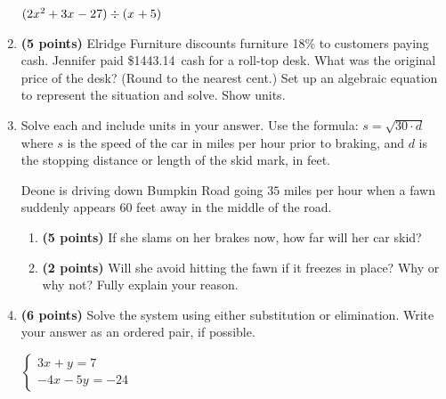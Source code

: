 \documentclass[12pt]{amsart}
\begin{document}
\begin{enumerate}
$(2x^{2}+3x^{}-27) \div (x^{}+5)$

\vfill  \vfill \vfill
\newpage\def \discount{18}\def \paid{1443.14}\def \rainy{9.13}\def \orcost{1759.93}\def \purcost{1223.00}\def \orrainy{11.13}
\item {\bf (5 points)} 
 Elridge Furniture discounts furniture \discount\% to customers paying cash. Jennifer paid \$\paid\ cash for a roll-top desk. What was the original price of the desk? (Round to the nearest cent.) Set up an algebraic equation to represent the situation and solve. Show units.

\vfill 
\def \insvar{30}\def \d{60}\def \zerospeed{42.43}\def \slimit{35}\def \s{54}\def \skidd{97.2}\def \safed{40.833}\def \rsafed{40}

 
\item Solve each and include units in your answer. Use the formula: $s = \sqrt{\insvar \cdot d}$ where $s$ is the speed of the car in miles per hour prior to braking, and $d$ is the stopping distance or length of the skid mark, in feet. 

\vspace{3mm}

Deone is driving down Bumpkin Road going $\slimit$ miles per hour when a fawn suddenly appears $\d$ feet away in the middle of the road. \begin{enumerate}
\item {\bf (5 points)} If she slams on her brakes now, how far will her car skid? \vspace{4cm}
\item {\bf (2 points)} Will she avoid hitting the fawn if it freezes in place? Why or why not? Fully explain your reason. \vspace{3cm}
\end{enumerate}


\newpage\def \xis{1}\def \yis{4}\def \nomatcho{[2,5,3,2]}\def \a{2}\def \c{-5}\def \b{-3}\def \d{2}\def \polyonesol{-10}\def \polytwosol{3}\def \xgoodone{2x^{}}\def \ygoodone{-3y^{}}\def \xgoodtwo{-5x^{}}\def \ygoodtwo{+2y^{}}\def \unitize{[0,1,0,0,1,0]}\def \mtem{3}\def \ntem{4}\def \ptem{-4}\def \qtem{-5}\def \m{3}\def \n{1}\def \p{-4}\def \q{-5}\def \polytonesol{7}\def \polyttwosol{-24}\def \xtgoodone{3x^{}}\def \ytgoodone{+y^{}}\def \xtgoodtwo{-4x^{}}\def \ytgoodtwo{-5y^{}}
\item {\bf (6 points)} 
 Solve the system using either substitution or elimination. Write your answer as an ordered pair, if possible. 

$ \begin{cases} \xtgoodone \ytgoodone = \polytonesol \\
\xtgoodtwo \ytgoodtwo = \polyttwosol
\end{cases}$


\end{enumerate}
\end{document}
